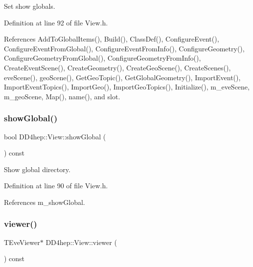 Set show globals. 



Definition at line 92 of file View.\+h.



References Add\+To\+Global\+Items(), Build(), Class\+Def(), Configure\+Event(), Configure\+Event\+From\+Global(), Configure\+Event\+From\+Info(), Configure\+Geometry(), Configure\+Geometry\+From\+Global(), Configure\+Geometry\+From\+Info(), Create\+Event\+Scene(), Create\+Geometry(), Create\+Geo\+Scene(), Create\+Scenes(), eve\+Scene(), geo\+Scene(), Get\+Geo\+Topic(), Get\+Global\+Geometry(), Import\+Event(), Import\+Event\+Topics(), Import\+Geo(), Import\+Geo\+Topics(), Initialize(), m\+\_\+eve\+Scene, m\+\_\+geo\+Scene, Map(), name(), and slot.

\hypertarget{class_d_d4hep_1_1_view_af94c772b1eaa6fbd595fa606da194282}{}\label{class_d_d4hep_1_1_view_af94c772b1eaa6fbd595fa606da194282} 
\subsubsection{\texorpdfstring{show\+Global()}{showGlobal()}}
{\footnotesize\ttfamily bool D\+D4hep\+::\+View\+::show\+Global (\begin{DoxyParamCaption}{ }\end{DoxyParamCaption}) const\hspace{0.3cm}{\ttfamily [inline]}}



Show global directory. 



Definition at line 90 of file View.\+h.



References m\+\_\+show\+Global.

\hypertarget{class_d_d4hep_1_1_view_a36a5945d05049da6f7e84618c3aea3a3}{}\label{class_d_d4hep_1_1_view_a36a5945d05049da6f7e84618c3aea3a3} 
\subsubsection{\texorpdfstring{viewer()}{viewer()}}
{\footnotesize\ttfamily T\+Eve\+Viewer$\ast$ D\+D4hep\+::\+View\+::viewer (\begin{DoxyParamCaption}{ }\end{DoxyParamCaption}) const\hspace{0.3cm}{\ttfamily [inline]}}



